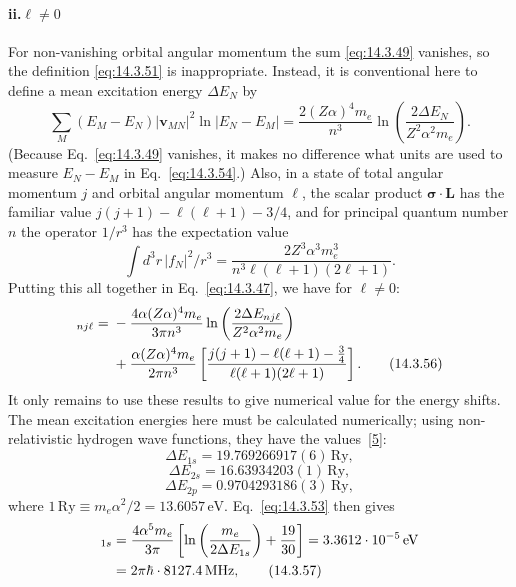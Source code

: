 \paragraph{ii.\quad $\ell\ne0$}
For non-vanishing orbital angular momentum the sum \eqref{eq:14.3.49}
vanishes, so the definition \eqref{eq:14.3.51} is inappropriate. Instead, it
is conventional here to define a mean excitation energy $\Delta E_N$ by
\begin{equation}
\sum_M(E_M-E_N)|\mathbf v_{MN}|^2\ln|E_N-E_M|
=\frac{2(Z\alpha)^4m_e}{n^3}\ln\left(
\frac{2\Delta E_N}{Z^2\alpha^2m_e}\right).
\tag{14.3.54}\label{eq:14.3.54}
\end{equation}
(Because Eq.~\eqref{eq:14.3.49} vanishes, it makes no difference what units
are used to measure $E_N-E_M$ in Eq.~\eqref{eq:14.3.54}.) Also, in a state of
total angular momentum $j$ and orbital angular momentum $\ell$, the scalar
product $\boldsymbol\sigma\cdot\mathbf L$ has the familiar value
$j(j+1)-\ell(\ell+1)-3/4$, and for principal quantum number $n$ the operator
$1/r^3$ has the expectation value
\begin{equation}
\int d^3r\,|f_N|^2/r^3
=\frac{2Z^3\alpha^3m_e^3}{n^3\ell(\ell+1)(2\ell+1)}.
\tag{14.3.55}\label{eq:14.3.55}
\end{equation}
Putting this all together in Eq.~\eqref{eq:14.3.47}, we have for $\ell\ne0$:
\begin{align}
[\delta E]_{nj\ell}={}&-\frac{4\alpha(Z\alpha)^4m_e}{3\pi n^3}
\ln\left(\frac{2\Delta E_{nj\ell}}{Z^2\alpha^2m_e}\right)\notag\\
&+\frac{\alpha(Z\alpha)^4m_e}{2\pi n^3}
\left[\frac{j(j+1)-\ell(\ell+1)-\tfrac34}
{\ell(\ell+1)(2\ell+1)}\right].
\tag{14.3.56}\label{eq:14.3.56}
\end{align}
It only remains to use these results to give numerical value for the energy
shifts. The mean excitation energies here must be calculated numerically;
using non-relativistic hydrogen wave functions, they have the
values~\hyperlink{ref:14.5}{[5]}:
\[
\Delta E_{1s}=19.769266917(6)\,\mathrm{Ry},
\]
\[
\Delta E_{2s}=16.63934203(1)\,\mathrm{Ry},
\]
\[
\Delta E_{2p}=0.9704293186(3)\,\mathrm{Ry},
\]
where $1\,\mathrm{Ry}\equiv m_e\alpha^2/2=13.6057\,\mathrm{eV}$.
Eq.~\eqref{eq:14.3.53} then gives
\begin{align}
[\delta E]_{1s}
&=\frac{4\alpha^5m_e}{3\pi}
\left[\ln\left(\frac{m_e}{2\Delta E_{1s}}\right)+\frac{19}{30}\right]
=3.3612\cdot10^{-5}\,\mathrm{eV}\notag\\
&=2\pi\hbar\cdot8127.4\,\mathrm{MHz},
\tag{14.3.57}\label{eq:14.3.57}
\end{align}
